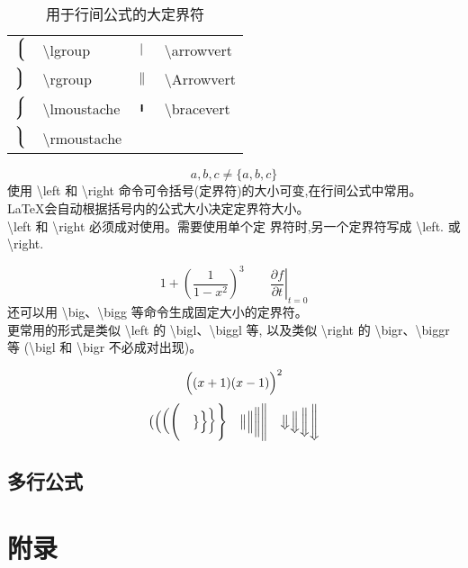 \documentclass[a4paper]{ctexart}
\begin{document}
    \begin{table}[H]
        \centering
        \caption{用于行间公式的大定界符}
        \begin{tabular}{clcl}
            \toprule
            $\left\lgroup\right.$           & \textbackslash lgroup         & 
            $\left\arrowvert\right.$        & \textbackslash arrowvert      \\
            $\left\rgroup\right.$           & \textbackslash rgroup         &
            $\left\Arrowvert\right.$        & \textbackslash Arrowvert      \\ 
            $\left\lmoustache\right.$       & \textbackslash lmoustache     &
            $\left\bracevert\right.$        & \textbackslash bracevert      \\
            $\left\rmoustache\right.$       & \textbackslash rmoustache     \\
            \bottomrule
        \end{tabular}
    \end{table}
    \[ {a,b,c} \neq \{a,b,c\} \]
    使用 \textbackslash left 和 \textbackslash right 命令可令括号(定界符)的大小可变,在行间公式中常用。%
    \LaTeX 会自动根据括号内的公式大小决定定界符大小。\\
    \textbackslash left 和 \textbackslash right 必须成对使用。需要使用单个定 界符时,另一个定界符写成%
    \textbackslash left. 或 \textbackslash right.\par
    \[
        1 + \left( \frac{1}{1 - x^2} \right)^3  \qquad
        \left.\frac{\partial f}{\partial t} \right|_{t = 0} 
    \]
    还可以用 \textbackslash big、\textbackslash bigg 等命令生成固定大小的定界符。\\
    更常用的形式是类似 \textbackslash left 的 \textbackslash bigl、\textbackslash biggl 等,%
    以及类似 \textbackslash right 的 \textbackslash bigr、\textbackslash biggr 等%
    (\textbackslash bigl 和 \textbackslash bigr 不必成对出现)。\par
    \[ \Bigl((x + 1)(x - 1)\Bigr)^2 \]
    \[  \bigl( \Bigl( \biggl( \Biggl( \quad 
        \bigr\} \Bigr\} \biggr\} \Biggr\} \quad
        \big\| \Big\| \bigg\| \Bigg\| \quad
        \big\Downarrow \Big\Downarrow
        \bigg\Downarrow \Bigg\Downarrow
    \]
    \subsection{多行公式}

    \newpage
    \appendix
    \section{附录}
\end{document}
